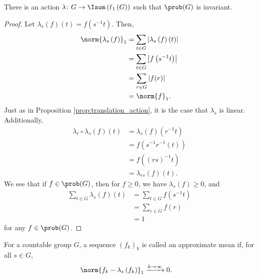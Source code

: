 \begin{proposition}
  There is an action $\lambda\colon G\rightarrow \Isom\left(\ell_{1}\left(G\right)\right)$ such that $\prob(G)$ is invariant.
\end{proposition}
\begin{proof}
  Let $\lambda_s\left(f\right)\left(t\right) = f\left(s^{-1}t\right)$. Then,
  \begin{align*}
    \norm{\lambda_s\left(f\right)}_1 &= \sum_{t\in G}\left\vert \lambda_s\left(f\right)\left(t\right) \right\vert\\
                                     &= \sum_{t\in G}\left\vert f\left(s^{-1}t\right) \right\vert\\
                                     &= \sum_{r\in G}\left\vert f(r) \right\vert\\
                                     &= \norm{f}_{1}.
  \end{align*}
  Just as in Proposition \ref{prop:translation_action}, it is the case that $\lambda_s$ is linear. Additionally,
  \begin{align*}
    \lambda_r\circ \lambda_s\left(f\right)\left(t\right) &= \lambda_s\left(f\right)\left(r^{-1}t\right)\\
                                                         &= f\left(s^{-1}r^{-1}\left(t\right)\right)\\
                                                         &= f\left(\left(rs\right)^{-1}t\right)\\
                                                         &= \lambda_{rs}\left(f\right)\left(t\right).
  \end{align*}
  We see that if $f\in \prob(G)$, then for $f\geq 0$, we have $\lambda_s\left(f\right) \geq 0$, and
  \begin{align*}
    \sum_{t\in G}\lambda_s\left(f\right)\left(t\right) &= \sum_{t\in G}f\left(s^{-1}t\right)\\
                                                       &= \sum_{r\in G}f\left(r\right)\\
                                                       &= 1
  \end{align*}
  for any $f\in \prob(G)$.
\end{proof}
\begin{definition}\label{def:approximate_mean}
  For a countable group $G$, a sequence $\left(f_k\right)_k$ is called an approximate mean if, for all $s\in G$,
  \begin{align*}
    \norm{f_k - \lambda_s\left(f_k\right)}_{1} &\xrightarrow{k\rightarrow \infty}0.
  \end{align*}
\end{definition}
